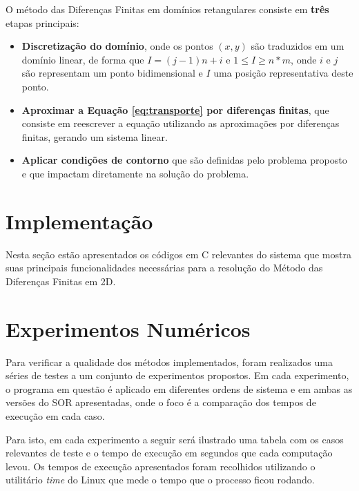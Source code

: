 \documentclass[
	11pt,				%
	oneside,			%
	a4paper,			%
	english,			%
	brazil,				%
	]{article}
\begin{document}
O método das Diferenças Finitas em domínios retangulares consiste em 
\textbf{três} etapas principais:

\begin{itemize}
 \item \textbf{Discretização do domínio}, onde os pontos $(x,y)$ são traduzidos 
em um domínio linear, de forma que $I = (j-1)n + i$ e $ 1 \le I \ge n*m$, onde 
$i$ e $j$ são representam um ponto bidimensional e $I$ uma posição 
representativa deste ponto.
 \item \textbf{Aproximar a Equação \eqref{eq:transporte} por diferenças 
finitas}, que consiste em reescrever a equação utilizando as aproximações por 
diferenças finitas, gerando um sistema linear.
 \item \textbf{Aplicar condições de contorno} que são definidas pelo problema 
proposto e que impactam diretamente na solução do problema.
\end{itemize}


\section{Implementação}
Nesta seção estão apresentados os códigos em C relevantes do sistema que mostra 
suas principais funcionalidades necessárias para a resolução do Método das 
Diferenças Finitas em 2D.

\section{Experimentos Numéricos}
Para verificar a qualidade dos métodos implementados, foram realizados uma 
séries de testes a um conjunto de experimentos propostos. Em cada experimento, 
o programa em questão é aplicado em diferentes ordens de sistema e em ambas as 
versões do SOR apresentadas, onde o foco é a comparação dos tempos de execução 
em cada caso.

Para isto, em cada experimento a seguir será ilustrado uma tabela com os casos 
relevantes de teste e o tempo de execução em segundos que cada computação 
levou. Os tempos de execução apresentados foram recolhidos utilizando 
o utilitário \textit{time} do Linux que mede o tempo que o processo ficou 
rodando.
\end{document}
